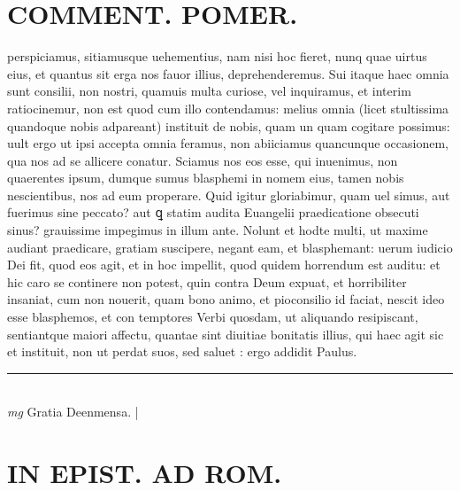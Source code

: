 \documentclass{article}
\begin{document}
\begin{pages}
\section*{COMMENT. POMER.  }\pstart perspiciamus, sitiamusque uehementius, nam nisi hoc fieret, nunq quae uirtus eius, et quantus sit erga nos fauor illius, deprehenderemus. Sui itaque haec omnia sunt consilii, non nostri, quamuis multa curiose, vel inquiramus, et interim ratiocinemur, non est quod cum illo contendamus: melius omnia (licet stultissima quandoque nobis adpareant) instituit de nobis, quam un quam cogitare possimus: uult ergo ut ipsi accepta omnia feramus, non abiiciamus quancunque occasionem, qua nos ad se allicere conatur. Sciamus nos eos esse, qui inuenimus, non quaerentes ipsum, dumque sumus blasphemi in nomem eius, tamen nobis nescientibus, nos ad eum properare. Quid igitur gloriabimur, quam uel simus, aut fuerimus sine peccato? aut ꝗ statim audita Euangelii praedicatione obsecuti sinus? grauissime impegimus in illum ante. Nolunt et hodte multi, ut maxime audiant praedicare, gratiam suscipere, negant eam, et blasphemant: uerum iudicio Dei fit, quod eos agit, et in hoc impellit, quod quidem horrendum est auditu: et hic caro se continere non potest, quin contra Deum expuat, et horribiliter insaniat, cum non nouerit, quam bono animo, et pioconsilio id faciat, nescit ideo esse blasphemos, et con temptores Verbi quosdam, ut aliquando resipiscant, sentiantque maiori affectu, quantae sint diuitiae bonitatis illius, qui haec agit sic et instituit, non ut perdat suos, sed saluet : ergo addidit Paulus.  \pend
\vspace{0.5cm}\noindent
\vspace{0.2cm}\rule{1cm}{0.2pt}\\ 
\hspace{0.2cm}\textit{mg}
\footnotesize Gratia Deenmensa. 
\normalsize| 
\section*{IN EPIST. AD ROM.  }
\marginpar{[ p.136 ]}
{}

\end{pages}
\end{document}
